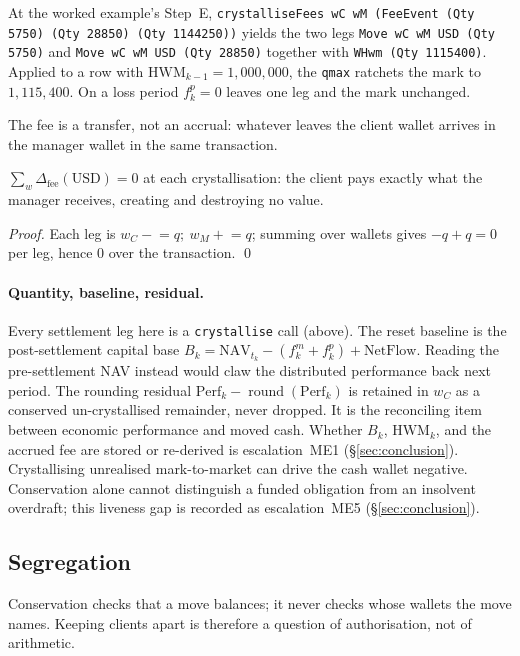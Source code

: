 \noindent At the worked example's Step~E,
\texttt{crystalliseFees wC wM (FeeEvent (Qty 5750) (Qty 28850) (Qty 1144250))} yields the
two legs \texttt{Move wC wM USD (Qty 5750)} and \texttt{Move wC wM USD (Qty 28850)} together
with \texttt{WHwm (Qty 1115400)}. Applied to a row with $\mathrm{HWM}_{k-1}=1{,}000{,}000$,
the \texttt{qmax} ratchets the mark to $1{,}115{,}400$. On a loss period $f^p_k=0$ leaves
one leg and the mark unchanged.

The fee is a transfer, not an accrual: whatever leaves the client wallet arrives in the
manager wallet in the same transaction.

\begin{theorem}
\label{thm:fee-zerosum}
$\sum_w \Delta_{\text{fee}}(\text{USD})=0$ at each crystallisation: the client pays exactly what
the manager receives, creating and destroying no value.
\end{theorem}
\noindent\textit{Proof.} Each leg is $w_C\mathbin{-}\!=q;\ w_M\mathbin{+}\!=q$; summing over
wallets gives $-q+q=0$ per leg, hence $0$ over the transaction. \qed

\paragraph{Quantity, baseline, residual.} Every settlement leg here is a \texttt{crystallise}
call (above). The reset baseline is the post-settlement capital base
$B_k=\mathrm{NAV}_{t_k}-(f^{m}_k+f^{p}_k)+\mathrm{NetFlow}$. Reading the pre-settlement NAV
instead would claw the distributed performance back next period. The rounding residual
$\mathrm{Perf}_k-\operatorname{round}(\mathrm{Perf}_k)$ is retained in $w_C$ as a conserved
un-crystallised remainder, never dropped. It is the reconciling item between economic
performance and moved cash. Whether $B_k$, $\mathrm{HWM}_k$, and the accrued fee are stored
or re-derived is escalation~ME1 (\S\ref{sec:conclusion}). Crystallising unrealised
mark-to-market can drive the cash wallet negative. Conservation alone cannot distinguish a
funded obligation from an insolvent overdraft; this liveness gap is recorded as
escalation~ME5 (\S\ref{sec:conclusion}).

\subsection{Segregation}
\label{sec:managed-segregation}

Conservation checks that a move balances; it never checks whose wallets the move names.
Keeping clients apart is therefore a question of authorisation, not of arithmetic.

